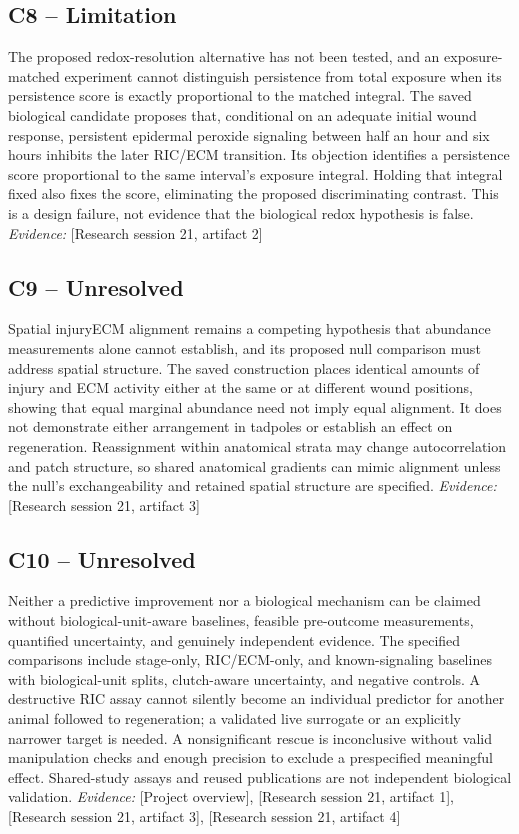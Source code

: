 \documentclass[11pt]{article}
\begin{document}
\subsection{C8 -- Limitation}
The proposed redox-resolution alternative has not been tested, and an exposure-matched experiment cannot distinguish persistence from total exposure when its persistence score is exactly proportional to the matched integral.
The saved biological candidate proposes that, conditional on an adequate initial wound response, persistent epidermal peroxide signaling between half an hour and six hours inhibits the later RIC/ECM transition. Its objection identifies a persistence score proportional to the same interval's exposure integral. Holding that integral fixed also fixes the score, eliminating the proposed discriminating contrast. This is a design failure, not evidence that the biological redox hypothesis is false.
\textit{Evidence: }[Research session 21, artifact 2]
\subsection{C9 -- Unresolved}
Spatial injury\textendash{}ECM alignment remains a competing hypothesis that abundance measurements alone cannot establish, and its proposed null comparison must address spatial structure.
The saved construction places identical amounts of injury and ECM activity either at the same or at different wound positions, showing that equal marginal abundance need not imply equal alignment. It does not demonstrate either arrangement in tadpoles or establish an effect on regeneration. Reassignment within anatomical strata may change autocorrelation and patch structure, so shared anatomical gradients can mimic alignment unless the null's exchangeability and retained spatial structure are specified.
\textit{Evidence: }[Research session 21, artifact 3]
\subsection{C10 -- Unresolved}
Neither a predictive improvement nor a biological mechanism can be claimed without biological-unit-aware baselines, feasible pre-outcome measurements, quantified uncertainty, and genuinely independent evidence.
The specified comparisons include stage-only, RIC/ECM-only, and known-signaling baselines with biological-unit splits, clutch-aware uncertainty, and negative controls. A destructive RIC assay cannot silently become an individual predictor for another animal followed to regeneration; a validated live surrogate or an explicitly narrower target is needed. A nonsignificant rescue is inconclusive without valid manipulation checks and enough precision to exclude a prespecified meaningful effect. Shared-study assays and reused publications are not independent biological validation.
\textit{Evidence: }[Project overview], [Research session 21, artifact 1], [Research session 21, artifact 3], [Research session 21, artifact 4]
\end{document}
